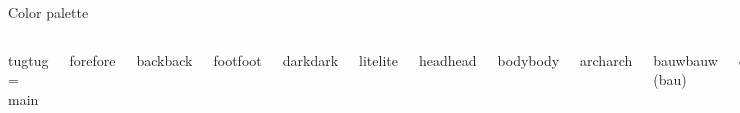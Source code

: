 \documentclass[table,aspectratio=43]{beamer}
\begin{document}
\begin{frame}{Color palette}
  \begin{columns}[t]
      \begin{beamercolorbox}[colsep*=4pt]{tug}tug = main\end{beamercolorbox}
      \begin{beamercolorbox}[colsep*=4pt]{fore}fore\end{beamercolorbox}
      \begin{beamercolorbox}[colsep*=4pt]{back}back\end{beamercolorbox}
      \begin{beamercolorbox}[colsep*=4pt]{foot}foot\end{beamercolorbox}
      \begin{beamercolorbox}[colsep*=4pt]{dark}dark\end{beamercolorbox}
      \begin{beamercolorbox}[colsep*=4pt]{lite}lite\end{beamercolorbox}
      \begin{beamercolorbox}[colsep*=4pt]{head}head\end{beamercolorbox}
      \begin{beamercolorbox}[colsep*=4pt]{body}body\end{beamercolorbox}
      \begin{beamercolorbox}[colsep*=4pt]{arch}arch\end{beamercolorbox}
      \begin{beamercolorbox}[colsep*=4pt]{bauw}bauw (bau)\end{beamercolorbox}
      \begin{beamercolorbox}[colsep*=4pt]{etec}etec (etit)\end{beamercolorbox}
      \begin{beamercolorbox}[colsep*=4pt]{mach}mach (mbww)\!\!\end{beamercolorbox}
      \begin{beamercolorbox}[colsep*=4pt]{chem}chem (tcvp)\end{beamercolorbox}
      \begin{beamercolorbox}[colsep*=4pt]{info}info (infbio)\end{beamercolorbox}
      \begin{beamercolorbox}[colsep*=4pt]{math}math (mpug)\end{beamercolorbox}

\end{columns}
\end{frame}
\end{document}
